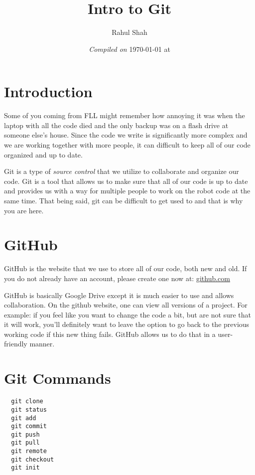 \documentclass[11pt,fleqn]{article}
\begin{document}
\title{Intro to Git}
\author{Rahul Shah}
\date{\textit{Compiled on} \today \hspace{1mm} at \currenttime}
\maketitle

\section{Introduction}

Some of you coming from FLL might remember how annoying it was when the laptop with all the code died and
the only backup was on a flash drive at someone else's house. Since the code we write is
significantly more complex and we are working together with more people, it can difficult to keep
all of our code organized and up to date.

Git is a type of \textit{source control} that we utilize to collaborate and organize our code. Git is
a tool that allows us to make sure that all of our code is up to date and provides us with a way for
multiple people to work on the robot code at the same time. That being said, git can be difficult
to get used to and that is why you are here.

\section{GitHub}

GitHub is the website that we use to store all of our code, both new and old. If you do not already have an account, please create one now at: \href{https://github.com}{github.com}

GitHub is basically Google Drive except it is much easier to use and allows collaboration. On the github website, one can view all versions of a project. For example: if you feel like you want to change the code a bit, but are not sure that it will work, you'll definitely want to leave the option to go back to the previous working code if this new thing fails. GitHub allows us to do that in a user-friendly manner.

\section{Git Commands}
\begin{verbatim}
  git clone
  git status
  git add
  git commit
  git push
  git pull
  git remote
  git checkout
  git init
\end{verbatim}
\end{document}
